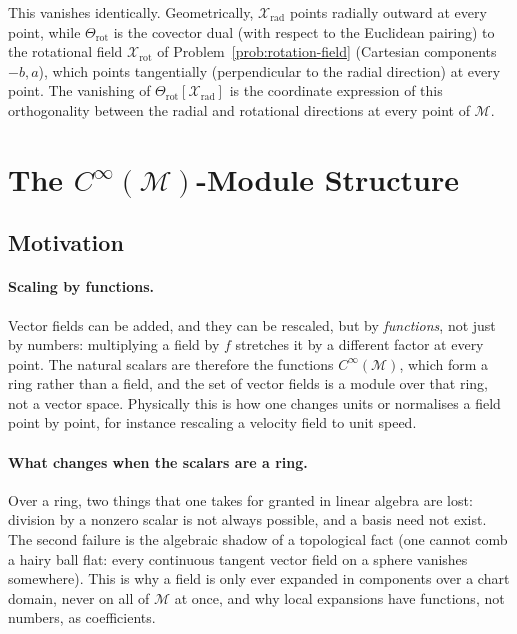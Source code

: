 \documentclass[11pt]{article}
\newcommand{\Cinf}{C^\infty(\mathcal M)}
\begin{document}
This vanishes identically. Geometrically, $\mathcal X_{\mathrm{rad}}$
points radially outward at every point, while $\Theta_{\mathrm{rot}}$ is
the covector dual (with respect to the Euclidean pairing) to the
rotational field $\mathcal X_{\mathrm{rot}}$ of
Problem~\ref{prob:rotation-field} (Cartesian components $-b,a$), which
points tangentially (perpendicular to the radial direction) at every
point. The vanishing of $\Theta_{\mathrm{rot}}[\mathcal X_{\mathrm{rad}}]$
is the coordinate expression of this orthogonality between the radial and
rotational directions at every point of $\mathcal M$.

\section{The $C^\infty(\mathcal M)$-Module Structure}

\subsection*{Motivation}

\paragraph{Scaling by functions.}
Vector fields can be added, and they can be rescaled, but by \emph{functions}, not just by numbers: multiplying a field by $f$ stretches it by a different factor at every point. The natural scalars are therefore the functions $\Cinf$, which form a ring rather than a field, and the set of vector fields is a module over that ring, not a vector space. Physically this is how one changes units or normalises a field point by point, for instance rescaling a velocity field to unit speed.

\paragraph{What changes when the scalars are a ring.}
Over a ring, two things that one takes for granted in linear algebra are lost: division by a nonzero scalar is not always possible, and a basis need not exist. The second failure is the algebraic shadow of a topological fact (one cannot comb a hairy ball flat: every continuous tangent vector field on a sphere vanishes somewhere). This is why a field is only ever expanded in components over a chart domain, never on all of $\mathcal M$ at once, and why local expansions have functions, not numbers, as coefficients.
\end{document}
